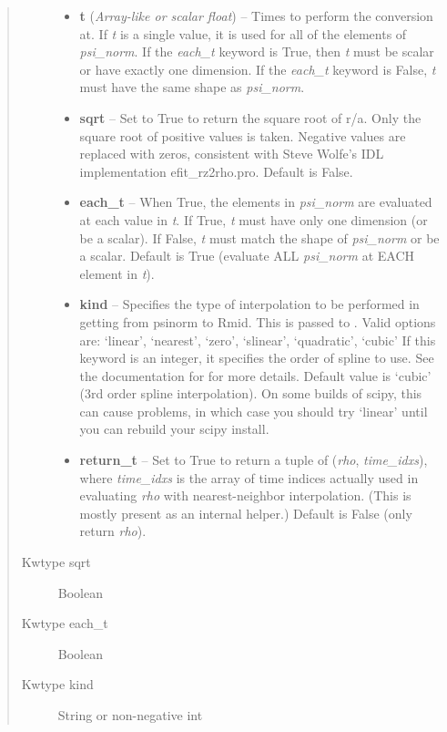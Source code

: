 \documentclass[letterpaper,10pt,english]{sphinxmanual}
\begin{document}
\begin{fulllineitems}
\begin{fulllineitems}
\begin{quote}
\begin{description}
\begin{itemize}
\item {} 
\textbf{t} (\emph{Array-like or scalar float}) -- Times to perform the conversion at.
If \emph{t} is a single value, it is used for all of the elements of
\emph{psi\_norm}. If the \emph{each\_t} keyword is True, then \emph{t} must be scalar
or have exactly one dimension. If the \emph{each\_t} keyword is False,
\emph{t} must have the same shape as \emph{psi\_norm}.

\item {} 
\textbf{sqrt} -- Set to True to return the square root of r/a. Only
the square root of positive values is taken. Negative values are
replaced with zeros, consistent with Steve Wolfe's IDL
implementation efit\_rz2rho.pro. Default is False.

\item {} 
\textbf{each\_t} -- When True, the elements in \emph{psi\_norm} are evaluated at
each value in \emph{t}. If True, \emph{t} must have only one dimension (or
be a scalar). If False, \emph{t} must match the shape of \emph{psi\_norm} or be
a scalar. Default is True (evaluate ALL \emph{psi\_norm} at EACH element in
\emph{t}).

\item {} 
\textbf{kind} -- Specifies the type of
interpolation to be performed in getting from psinorm to
Rmid. This is passed to
. Valid options are:
`linear', `nearest', `zero', `slinear', `quadratic', `cubic'
If this keyword is an integer, it specifies the order of spline
to use. See the documentation for  for more
details. Default value is `cubic' (3rd order spline
interpolation). On some builds of scipy, this can cause problems,
in which case you should try `linear' until you can rebuild your
scipy install.

\item {} 
\textbf{return\_t} -- Set to True to return a tuple of (\emph{rho},
\emph{time\_idxs}), where \emph{time\_idxs} is the array of time indices
actually used in evaluating \emph{rho} with nearest-neighbor
interpolation. (This is mostly present as an internal helper.)
Default is False (only return \emph{rho}).

\end{itemize}

\item[{Kwtype sqrt}] \leavevmode
Boolean

\item[{Kwtype each\_t}] \leavevmode
Boolean

\item[{Kwtype kind}] \leavevmode
String or non-negative int


\end{description}
\end{quote}
\end{fulllineitems}
\end{fulllineitems}
\end{document}
